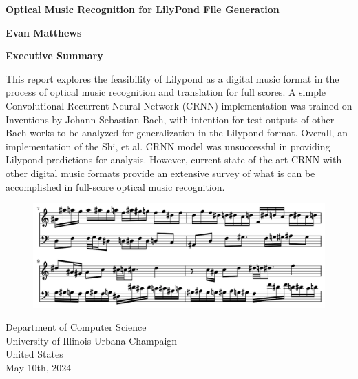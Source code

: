 \documentclass[sigconf]{acmart}
\begin{document}
\begin{titlepage}
    \begin{center}
        \vspace*{1cm}
            
        \Huge
        \textbf{Optical Music Recognition for LilyPond File Generation}
            
        \vspace{0.5cm}
        \LARGE
            
        \vspace{0.5cm}
            
        \textbf{Evan Matthews}

        \vspace{0.9cm}
		\textbf{Executive Summary}

		\vspace{0.5cm}
		This report explores the feasibility of Lilypond as a digital music format in the process of optical music recognition and translation for full scores.
		A simple Convolutional Recurrent Neural Network (CRNN) implementation was trained on Inventions by Johann Sebastian Bach, with intention for test outputs of other Bach works to be analyzed for generalization in the Lilypond format.
		Overall, an implementation of the Shi, et al. CRNN model was unsuccessful in providing Lilypond predictions for analysis. 
		However, current state-of-the-art CRNN with other digital music formats provide an extensive survey of what is can be accomplished in full-score optical music recognition.

		\begin{figure}
			\centering
			\includegraphics[width = .8\linewidth]{./figures/cover.png}
		\end{figure}

        \vfill
            
        \vspace{0.8cm}
            
        \Large
        Department of Computer Science\\
        University of Illinois Urbana-Champaign\\
        United States\\
        May 10th, 2024
            
    \end{center}
\end{titlepage}
\end{document}
